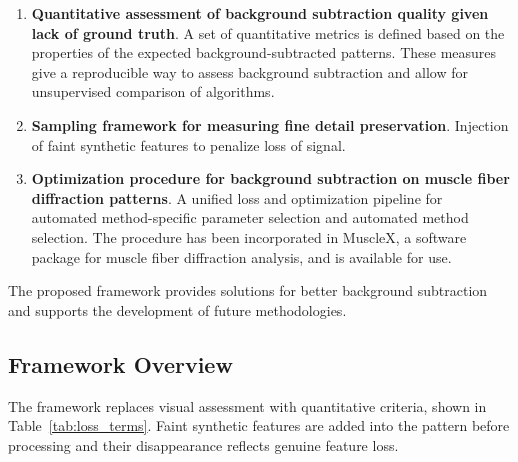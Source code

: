 \documentclass[journal,article,submit,moreauthors]{Definitions/mdpi}
\begin{document}
\begin{enumerate}
	\item \textbf{Quantitative assessment of background subtraction quality given lack of ground truth}. A set of quantitative metrics is defined based on the properties of the expected background-subtracted patterns. These measures give a reproducible way to assess background subtraction and allow for unsupervised comparison of algorithms.
	\item \textbf{Sampling framework for measuring fine detail preservation}. Injection of faint synthetic features to penalize loss of signal.
	\item \textbf{Optimization procedure for background subtraction on muscle fiber diffraction patterns}. A unified loss and optimization pipeline for automated method-specific parameter selection and automated method selection. The procedure has been incorporated in MuscleX, a software package for muscle fiber diffraction analysis, and is available for use.
\end{enumerate}

The proposed framework provides solutions for better background subtraction and supports the development of future methodologies.

\subsection{Framework Overview}
\label{sec:framework_overview}

The framework replaces visual assessment with quantitative criteria, shown in Table~\ref{tab:loss_terms}. Faint synthetic features are added into the pattern before processing and their disappearance reflects genuine feature loss.
\end{document}
